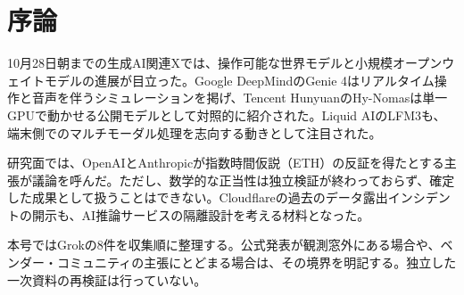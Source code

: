 \section*{序論}
10月28日朝までの生成AI関連Xでは、操作可能な世界モデルと小規模オープンウェイトモデルの進展が目立った。Google DeepMindのGenie 4はリアルタイム操作と音声を伴うシミュレーションを掲げ、Tencent HunyuanのHy-Nomasは単一GPUで動かせる公開モデルとして対照的に紹介された。Liquid AIのLFM3も、端末側でのマルチモーダル処理を志向する動きとして注目された。

研究面では、OpenAIとAnthropicが指数時間仮説（ETH）の反証を得たとする主張が議論を呼んだ。ただし、数学的な正当性は独立検証が終わっておらず、確定した成果として扱うことはできない。Cloudflareの過去のデータ露出インシデントの開示も、AI推論サービスの隔離設計を考える材料となった。

本号ではGrokの8件を収集順に整理する。公式発表が観測窓外にある場合や、ベンダー・コミュニティの主張にとどまる場合は、その境界を明記する。独立した一次資料の再検証は行っていない。
